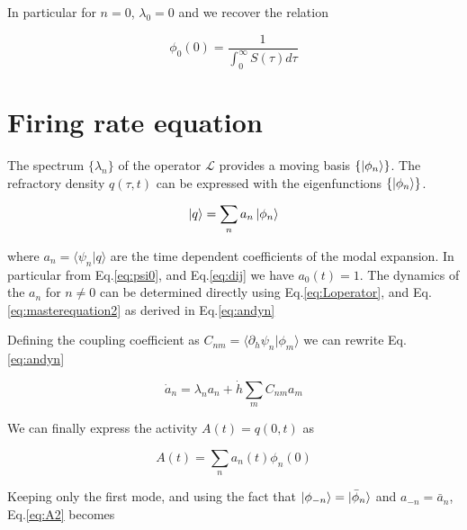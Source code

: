\documentclass[12pt,twoside]{report}
\begin{document}
In particular for $n=0$, $\lambda_0=0$ and we recover the relation

\begin{equation}
\phi_0(0) = \frac{1}{\int_0^{\infty}S(\tau)d\tau}
\end{equation}

\section{Firing rate equation}
\label{sec:emissionrateequation}

The spectrum $\{\lambda_n\}$ of the operator $\mathcal{L}$ provides a moving basis $ \{\ket{\phi_n}\}$. The refractory density $q(\tau,t)$ can be expressed with the eigenfunctions  $ \{\ket{\phi_n}\}$. 

\begin{equation}
\label{eq:q}
\ket{q}=\sum_na_n\ket{\phi_n}
\end{equation}

where $a_n=\langle \psi_n | q\rangle$ are the time dependent coefficients of the modal expansion. In particular from Eq.\eqref{eq:psi0}, and Eq.\eqref{eq:dij} we have $a_0(t)=1$. The dynamics of the $a_n$ for $n\neq0$ can be determined directly using Eq.\eqref{eq:Loperator}, and Eq.\eqref{eq:masterequation2} as derived in Eq.\eqref{eq:andyn}


Defining the coupling coefficient as $C_{nm}=\langle\partial_h\psi_n|\phi_m \rangle $ we can rewrite Eq.\ref{eq:andyn}

\begin{equation}
\dot{a}_n=\lambda_n a_n +  \dot{h}\sum_mC_{nm}a_m 
\end{equation}

We can finally express the activity $A(t)=q(0,t)$ as

\begin{equation}
\label{eq:A2}
A(t)=\sum_na_n(t)\phi_n(0)
\end{equation}

Keeping only the first mode, and using the fact that $\ket{\phi_{-n}}=\ket{\bar{\phi}_n}$ and $a_{-n}=\bar{a}_n$,  Eq.\eqref{eq:A2} becomes
\end{document}
